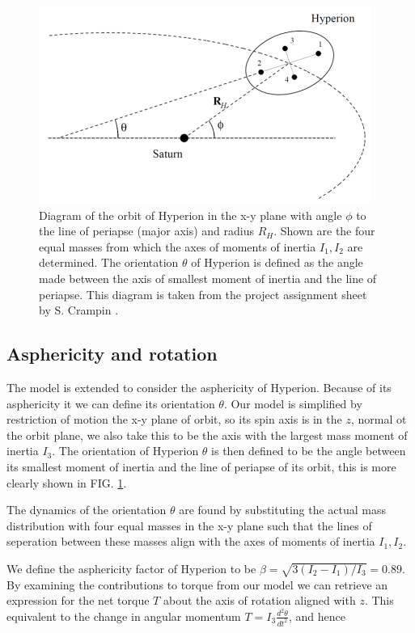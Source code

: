 \documentclass[10pt, twocolumn]{article} %
\begin{document}
\begin{figure}[tb!]
\centering
\includegraphics[width=0.95\columnwidth]{hyperion_orbit_diagram.png}
  \caption{Diagram of the orbit of Hyperion in the x-y plane with angle $\phi$ to the line of periapse (major axis) and radius $R_H$. Shown are the four equal masses from which the axes of moments of inertia $I_1, I_2$ are determined. The orientation $\theta$ of Hyperion is defined as the angle made between the axis of smallest moment of inertia and the line of periapse. This diagram is taken from the project assignment sheet by S. Crampin \cite{Crampin}.}
\label{orientation_diagram}
\end{figure}

\subsection*{Asphericity and rotation}

The model is extended to consider the asphericity of Hyperion. Because of its asphericity it we can define its orientation $\theta$. Our model is simplified by restriction of motion the x-y plane of orbit, so its spin axis is in the $z$, normal ot the orbit plane, we also take this to be the axis with the largest mass moment of inertia $I_3$. The orientation of Hyperion $\theta$ is then defined to be the angle between its smallest moment of inertia and the line of periapse of its orbit, this is more clearly shown in FIG. \ref{orientation_diagram}.

The dynamics of the orientation $\theta$ are found by substituting the actual mass distribution with four equal masses in the x-y plane such that the lines of seperation between these masses align with the axes of moments of inertia $I_1, I_2$.

We define the asphericity factor of Hyperion to be $\beta = \sqrt{3(I_2 - I_1)/I_3} = 0.89$. By examining the contributions to torque from our model we can retrieve an expression for the net torque $T$ about the axis of rotation aligned with $z$. This equivalent to the change in angular momentum $T = I_3 \frac{d^2\theta}{dt^2}$, and hence
\end{document}
